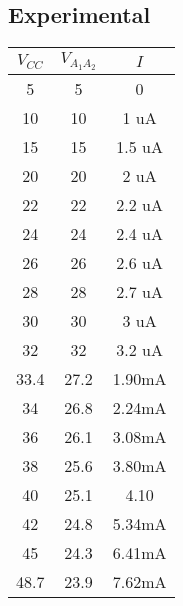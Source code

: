   \subsection{Experimental}
  \begin{table}[H]
    \begin{center}
      \begin{tabular}{c|c|c}
        $V_{CC}$ &$V_{A_1A_2}$ &$I$  \\
        \hline
        5     &5    &0     \\
        10    &10   &1   uA   \\
        15    &15   &1.5 uA \\
        20    &20   &2   uA   \\
        22    &22   &2.2 uA \\
        24    &24   &2.4 uA \\
        26    &26   &2.6 uA \\
        28    &28   &2.7 uA \\
        30    &30   &3   uA   \\
        32    &32   &3.2 uA \\
        33.4  &27.2 &1.90mA\\
        34    &26.8 &2.24mA\\
        36    &26.1 &3.08mA\\
        38    &25.6 &3.80mA\\
        40    &25.1 &4.10  \\
        42    &24.8 &5.34mA\\
        45    &24.3 &6.41mA \\
        48.7  &23.9 &7.62mA  
      \end{tabular}
    \end{center} 
  \end{table}

